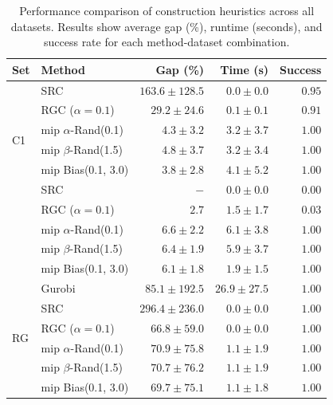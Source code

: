 \documentclass[twocolumn]{article} %
\begin{document}
\begin{table}[h]
    \caption{Performance comparison of construction heuristics across all datasets. Results show average gap (\%), runtime (seconds), and success rate for each method-dataset combination.}
    \label{tab:construction_comparison}
    \centering
    \setlength{\tabcolsep}{2.1pt}
    \begin{tabular}{llrrr}
        \toprule
        \textbf{Set} & \textbf{Method} & \textbf{Gap (\%)} & \textbf{Time (s)} & \textbf{Success} \\
        \midrule
        \multirow[c]{6}{*}{C1} & SRC & $163.6 \pm 128.5$ & $0.0 \pm 0.0$ & $0.95$ \\
        & RGC ($\alpha = 0.1$) & $29.2 \pm 24.6$ & $0.1 \pm 0.1$ & $0.91$ \\
        & \gls{mip} $\alpha$-Rand(0.1) & $4.3 \pm 3.2$ & $3.2 \pm 3.7$ & $1.00$ \\
        & \gls{mip} $\beta$-Rand(1.5) & $4.8 \pm 3.7$ & $3.2 \pm 3.4$ & $1.00$ \\
        & \gls{mip} Bias(0.1, 3.0) & $\mathbf{3.8 \pm 2.8}$ & $4.1 \pm 5.2$ & $1.00$ \\
        \midrule
        \multirow[c]{6}{*}{C2} & SRC & $-$ & $0.0 \pm 0.0$ & $0.00$ \\
        & RGC ($\alpha = 0.1$) & $2.7$ & $1.5 \pm 1.7$ & $0.03$ \\
        & \gls{mip} $\alpha$-Rand(0.1) & $6.6 \pm 2.2$ & $6.1 \pm 3.8$ & $1.00$ \\
        & \gls{mip} $\beta$-Rand(1.5) & $6.4 \pm 1.9$ & $5.9 \pm 3.7$ & $1.00$ \\
        & \gls{mip} Bias(0.1, 3.0) & $\mathbf{6.1 \pm 1.8}$ & $1.9 \pm 1.5$ & $1.00$ \\
        \midrule
        \multirow[c]{6}{*}{RG} & Gurobi & $85.1 \pm 192.5$ & $26.9 \pm 27.5$ & $1.00$ \\
        & SRC & $296.4 \pm 236.0$ & $0.0 \pm 0.0$ & $1.00$ \\
        & RGC ($\alpha = 0.1$) & $66.8 \pm 59.0$ & $0.0 \pm 0.0$ & $1.00$ \\
        & \gls{mip} $\alpha$-Rand(0.1) & $70.9 \pm 75.8$ & $1.1 \pm 1.9$ & $1.00$ \\
        & \gls{mip} $\beta$-Rand(1.5) & $70.7 \pm 76.2$ & $1.1 \pm 1.9$ & $1.00$ \\
        & \gls{mip} Bias(0.1, 3.0) & $\mathbf{69.7 \pm 75.1}$ & $1.1 \pm 1.8$ & $1.00$ \\
        \bottomrule
    \end{tabular}
\end{table}
\end{document}
